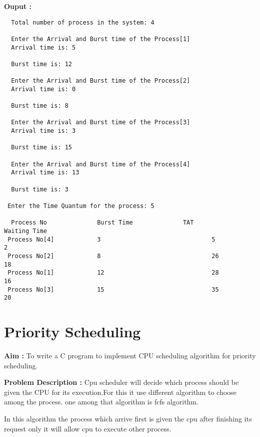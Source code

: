 \documentclass[journal,onecolumn]{IEEEtran}
\begin{document}
\textbf{Ouput :}
\begin{verbatim}
  Total number of process in the system: 4

  Enter the Arrival and Burst time of the Process[1]
  Arrival time is: 5
  
  Burst time is: 12
 
  Enter the Arrival and Burst time of the Process[2]
  Arrival time is: 0
  
  Burst time is: 8
 
  Enter the Arrival and Burst time of the Process[3]
  Arrival time is: 3
  
  Burst time is: 15
 
  Enter the Arrival and Burst time of the Process[4]
  Arrival time is: 13
  
  Burst time is: 3 
 
 Enter the Time Quantum for the process: 5 
 
  Process No              Burst Time              TAT             Waiting Time 
 Process No[4]            3                               5                       2
 Process No[2]            8                               26                      18
 Process No[1]            12                              28                      16
 Process No[3]            15                              35                      20
\end{verbatim}



\section{Priority Scheduling}
\textbf{Aim : } To write a C program to implement CPU scheduling algorithm for priority scheduling.

\textbf{Problem Description : }
Cpu scheduler will decide which process should be given the CPU for its execution.For this
it use different algorithm to choose among the process. one among that algorithm is fcfs
algorithm.

In this algorithm the process which arrive first is given the cpu after finishing its request
only it will allow cpu to execute other process.
\end{document}
